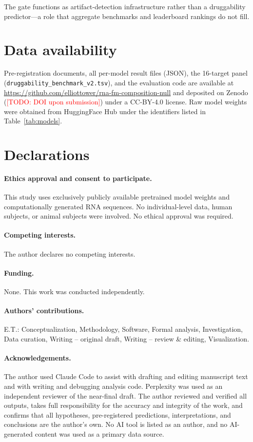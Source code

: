 \documentclass[11pt]{article}
\newcommand{\todo}[1]{\textcolor{red}{[TODO: #1]}}
\begin{document}
The gate functions as artifact-detection infrastructure rather than a
druggability predictor---a role that aggregate benchmarks and leaderboard
rankings do not fill.


\section*{Data availability}

Pre-registration documents, all per-model result files (JSON), the
16-target panel (\texttt{druggability\_benchmark\_v2.tsv}), and the
evaluation code are available at
\url{https://github.com/elliottower/rna-fm-composition-null}
and deposited on Zenodo (\todo{DOI upon submission}) under a CC-BY-4.0
license.  Raw model weights were obtained from HuggingFace Hub under the
identifiers listed in Table~\ref{tab:models}.

\section*{Declarations}

\paragraph{Ethics approval and consent to participate.}
This study uses exclusively publicly available pretrained model weights
and computationally generated RNA sequences.  No individual-level data,
human subjects, or animal subjects were involved.  No ethical approval
was required.

\paragraph{Competing interests.}
The author declares no competing interests.

\paragraph{Funding.}
None.  This work was conducted independently.

\paragraph{Authors' contributions.}
E.T.: Conceptualization, Methodology, Software, Formal analysis,
Investigation, Data curation, Writing -- original draft, Writing --
review \& editing, Visualization.

\paragraph{Acknowledgements.}
The author used Claude Code \citep{claudecode} to assist with drafting
and editing manuscript text and with writing and debugging analysis
code.  Perplexity \citep{perplexityai} was used as an independent
reviewer of the near-final draft.  The author reviewed and verified all
outputs, takes full responsibility for the accuracy and integrity of the
work, and confirms that all hypotheses, pre-registered predictions,
interpretations, and conclusions are the author's own.  No AI tool is
listed as an author, and no AI-generated content was used as a primary
data source.
\end{document}

